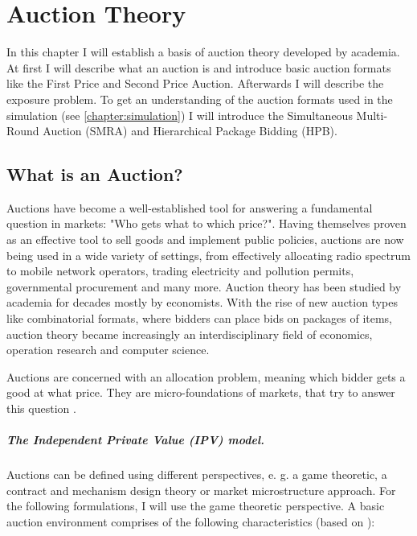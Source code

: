 \graphicspath{{./figures/ch2/}}

\chapter{Auction Theory}\label{chapter:theory}
In this chapter I will establish a basis of auction theory developed by academia. At first I will describe what an auction is and introduce basic auction formats like the First Price and Second Price Auction. Afterwards I will describe the exposure problem. To get an understanding of the auction formats used in the simulation (see \autoref{chapter:simulation}) I will introduce the Simultaneous Multi-Round Auction (SMRA) and Hierarchical Package Bidding (HPB). %


\section{What is an Auction?}
Auctions have become a well-established tool for answering a fundamental question in markets: "Who gets what to which price?". Having themselves proven as an effective tool to sell goods and implement public policies, auctions are now being used in a wide variety of settings, from effectively allocating radio spectrum to mobile network operators, trading electricity and pollution permits, governmental procurement and many more. Auction theory has been studied by academia for decades mostly by economists. With the rise of new auction types like combinatorial formats, where bidders can place bids on packages of items, auction theory became increasingly an interdisciplinary field of economics, operation research and computer science.

Auctions are concerned with an allocation problem, meaning which bidder gets a good at what price. They are micro-foundations of markets, that try to answer this question \cite{Cramton2006}. %

\paragraph{The Independent Private Value (IPV) model.}
Auctions can be defined using different perspectives, e. g. a game theoretic, a contract and mechanism design theory or market microstructure approach. For the following formulations, I will use the game theoretic perspective. A basic auction environment comprises of the following characteristics (based on \cite[p. 1]{Levin2004}):

